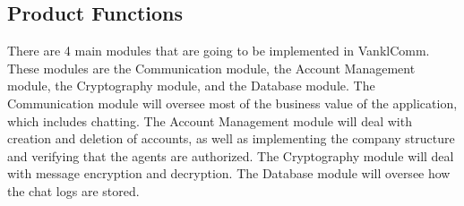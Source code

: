 \documentclass[]{article}
\begin{document}
\subsection{Product Functions}
\label{sub:product_functions}
There are 4 main modules that are going to be implemented in VanklComm. These modules are the Communication module, the Account Management module, the Cryptography module, and the Database module. The Communication module will oversee most of the business value of the application, which includes chatting. The Account Management module will deal with creation and deletion of accounts, as well as implementing the company structure and verifying that the agents are authorized. The Cryptography module will deal with message encryption and decryption. The Database module will oversee how the chat logs are stored.
\end{document}
